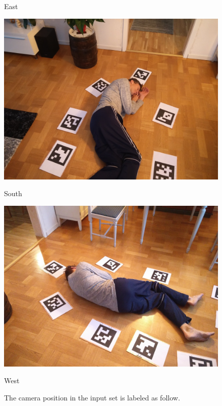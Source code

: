 \begin{figure}
\begin{center}
\begin{minipage}[t]{0.2\textwidth}
        \caption*{East}
    \end{minipage}
    \begin{minipage}[t]{0.2\textwidth}
        \includegraphics[width=\textwidth]{images/datasets/P2/images/093551.jpg}
        \caption*{South}
    \end{minipage}
    \begin{minipage}[t]{0.2\textwidth}
        \includegraphics[width=\textwidth]{images/datasets/P2/images/093335.jpg}
        \caption*{West}
    \end{minipage}
\end{center}
\caption{The camera position in the input set is labeled as follow.}
\label{fig:camera_pos_lables}
\end{figure}

